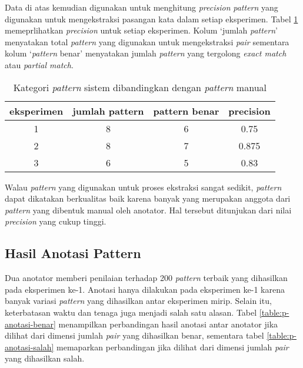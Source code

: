 Data di atas kemudian digunakan untuk menghitung \textit{precision} \textit{pattern} yang digunakan untuk mengekstraksi pasangan kata dalam setiap eksperimen. Tabel \ref{table:preceks} memeprlihatkan \textit{precision} untuk setiap eksperimen. Kolum `jumlah \textit{pattern}' menyatakan total \textit{pattern} yang digunakan untuk mengekstraksi \textit{pair} sementara kolum `\textit{pattern} benar' menyatakan jumlah \textit{pattern} yang tergolong \textit{exact match} atau \textit{partial match}. 

\begin{table}
  \centering
  \caption{Kategori \textit{pattern} sistem dibandingkan dengan \textit{pattern} manual}
  \label{table:preceks}
  \begin{tabular}{|c|c|c|c|} 
  \hline
  eksperimen & jumlah pattern & pattern benar & precision \\ \hline
  1 & 8 & 6 & 0.75 \\ \hline
  2 & 8 & 7 & 0.875 \\ \hline
  3 & 6 & 5 & 0.83 \\ \hline
  \end{tabular} 
\end{table}

Walau \textit{pattern} yang digunakan untuk proses ekstraksi sangat sedikit, \textit{pattern} dapat dikatakan berkualitas baik karena banyak yang merupakan anggota dari \textit{pattern} yang dibentuk manual oleh anotator. Hal tersebut ditunjukan dari nilai \textit{precision} yang cukup tinggi.

\subsection{Hasil Anotasi Pattern}
Dua anotator memberi penilaian terhadap 200 \textit{pattern} terbaik yang dihasilkan pada eksperimen ke-1. Anotasi hanya dilakukan pada eksperimen ke-1 karena banyak variasi \textit{pattern} yang dihasilkan antar eksperimen mirip. Selain itu, keterbatasan waktu dan tenaga juga menjadi salah satu alasan. Tabel \ref{table:p-anotasi-benar} menampilkan perbandingan hasil anotasi antar anotator jika dilihat dari dimensi jumlah \textit{pair} yang dihasilkan benar, sementara tabel \ref{table:p-anotasi-salah} memaparkan perbandingan jika dilihat dari dimensi jumlah \textit{pair} yang dihasilkan salah.

